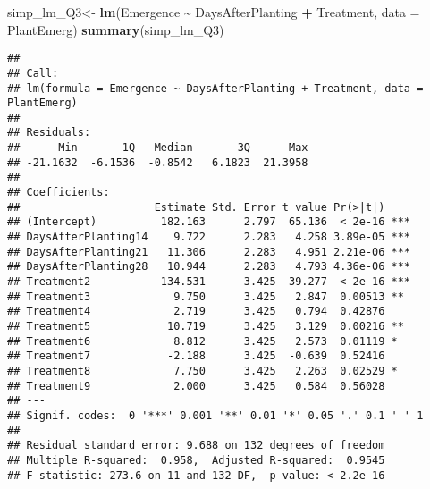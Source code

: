 \documentclass[
  12pt,
]{article}
\newenvironment{Shaded}{\begin{snugshade}}{\end{snugshade}}
\newcommand{\AttributeTok}[1]{\textcolor[rgb]{0.13,0.29,0.53}{#1}}
\newcommand{\CommentTok}[1]{\textcolor[rgb]{0.56,0.35,0.01}{\textit{#1}}}
\newcommand{\FunctionTok}[1]{\textcolor[rgb]{0.13,0.29,0.53}{\textbf{#1}}}
\newcommand{\NormalTok}[1]{#1}
\newcommand{\OtherTok}[1]{\textcolor[rgb]{0.56,0.35,0.01}{#1}}
\newcommand{\SpecialCharTok}[1]{\textcolor[rgb]{0.81,0.36,0.00}{\textbf{#1}}}
\newcommand{\StringTok}[1]{\textcolor[rgb]{0.31,0.60,0.02}{#1}}
\begin{document}
\begin{Shaded}
\begin{Highlighting}[]
\NormalTok{simp\_lm\_Q3}\OtherTok{\textless{}{-}} \FunctionTok{lm}\NormalTok{(Emergence }\SpecialCharTok{\textasciitilde{}}\NormalTok{ DaysAfterPlanting }\SpecialCharTok{+}\NormalTok{ Treatment, }\AttributeTok{data =}\NormalTok{ PlantEmerg)}
\FunctionTok{summary}\NormalTok{(simp\_lm\_Q3)        }
\end{Highlighting}
\end{Shaded}

\begin{verbatim}
## 
## Call:
## lm(formula = Emergence ~ DaysAfterPlanting + Treatment, data = PlantEmerg)
## 
## Residuals:
##      Min       1Q   Median       3Q      Max 
## -21.1632  -6.1536  -0.8542   6.1823  21.3958 
## 
## Coefficients:
##                     Estimate Std. Error t value Pr(>|t|)    
## (Intercept)          182.163      2.797  65.136  < 2e-16 ***
## DaysAfterPlanting14    9.722      2.283   4.258 3.89e-05 ***
## DaysAfterPlanting21   11.306      2.283   4.951 2.21e-06 ***
## DaysAfterPlanting28   10.944      2.283   4.793 4.36e-06 ***
## Treatment2          -134.531      3.425 -39.277  < 2e-16 ***
## Treatment3             9.750      3.425   2.847  0.00513 ** 
## Treatment4             2.719      3.425   0.794  0.42876    
## Treatment5            10.719      3.425   3.129  0.00216 ** 
## Treatment6             8.812      3.425   2.573  0.01119 *  
## Treatment7            -2.188      3.425  -0.639  0.52416    
## Treatment8             7.750      3.425   2.263  0.02529 *  
## Treatment9             2.000      3.425   0.584  0.56028    
## ---
## Signif. codes:  0 '***' 0.001 '**' 0.01 '*' 0.05 '.' 0.1 ' ' 1
## 
## Residual standard error: 9.688 on 132 degrees of freedom
## Multiple R-squared:  0.958,  Adjusted R-squared:  0.9545 
## F-statistic: 273.6 on 11 and 132 DF,  p-value: < 2.2e-16
\end{verbatim}

\begin{Shaded}
\end{Shaded}
\end{document}
